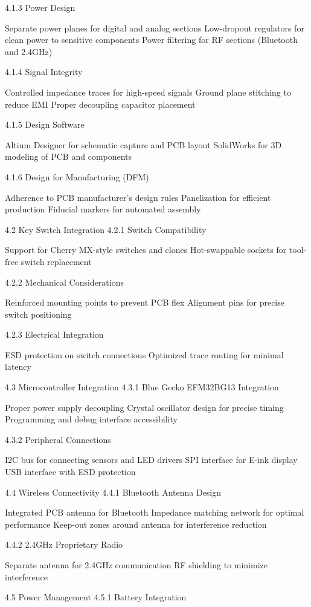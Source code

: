\documentclass[a4paper,11pt]{article}%
\begin{document}
4.1.3 Power Design

Separate power planes for digital and analog sections
Low-dropout regulators for clean power to sensitive components
Power filtering for RF sections (Bluetooth and 2.4GHz)

4.1.4 Signal Integrity

Controlled impedance traces for high-speed signals
Ground plane stitching to reduce EMI
Proper decoupling capacitor placement

4.1.5 Design Software

Altium Designer for schematic capture and PCB layout
SolidWorks for 3D modeling of PCB and components

4.1.6 Design for Manufacturing (DFM)

Adherence to PCB manufacturer's design rules
Panelization for efficient production
Fiducial markers for automated assembly

4.2 Key Switch Integration
4.2.1 Switch Compatibility

Support for Cherry MX-style switches and clones
Hot-swappable sockets for tool-free switch replacement

4.2.2 Mechanical Considerations

Reinforced mounting points to prevent PCB flex
Alignment pins for precise switch positioning

4.2.3 Electrical Integration

ESD protection on switch connections
Optimized trace routing for minimal latency

4.3 Microcontroller Integration
4.3.1 Blue Gecko EFM32BG13 Integration

Proper power supply decoupling
Crystal oscillator design for precise timing
Programming and debug interface accessibility

4.3.2 Peripheral Connections

I2C bus for connecting sensors and LED drivers
SPI interface for E-ink display
USB interface with ESD protection

4.4 Wireless Connectivity
4.4.1 Bluetooth Antenna Design

Integrated PCB antenna for Bluetooth
Impedance matching network for optimal performance
Keep-out zones around antenna for interference reduction

4.4.2 2.4GHz Proprietary Radio

Separate antenna for 2.4GHz communication
RF shielding to minimize interference

4.5 Power Management
4.5.1 Battery Integration
\end{document}
